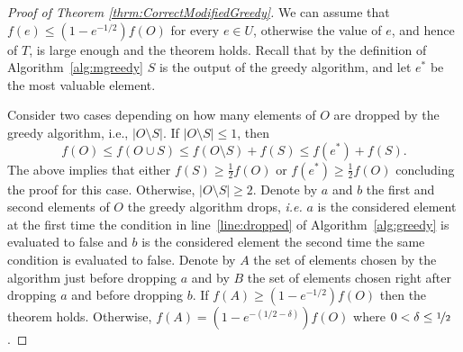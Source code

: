\documentclass[a4paper]{article}
\begin{document}

\begin{proof}[Proof of Theorem \ref{thrm:CorrectModifiedGreedy}]
	We can assume that $f(e) \leq (1 - e^{-1/2})f(O)$ for every $e \in U$, otherwise the value of $e$, and hence of $T$, is large enough and the theorem holds.
	Recall that by the definition of Algorithm~\ref{alg:mgreedy} $S$ is the output of the greedy algorithm, and let $e^*$ be the most valuable element.
	
	Consider two cases depending on how many elements of $O$ are dropped by the greedy algorithm, i.e., $|O \setminus S|$.
	If $|O \setminus S| \leq 1$, then
	$$
	f(O) \leq f(O \cup S) \leq f(O \setminus S) + f(S) \leq f(e^*) + f(S).
	$$
	The above implies that either $f(S) \geq \frac{1}{2}f(O)$ or $f(e^*) \geq \frac{1}{2}f(O)$ concluding the proof for this case.
	Otherwise, $|O \setminus S| \geq 2$.
	Denote by $a$ and $b$ the first and second elements of $O$ the greedy algorithm drops, {\em i.e.} $a$ is the considered element at the first time the condition in line~\ref{line:dropped} of Algorithm~\ref{alg:greedy} is evaluated to false and $b$ is the considered element the second time the same condition is evaluated to false.
	Denote by $A$ the set of elements chosen by the algorithm just before dropping $a$ and by
	$B$ the set of elements chosen right after dropping $a$ and before dropping $b$.
	If $f(A) \geq (1 - e^{-1/2})f(O)$ then the theorem holds.
	Otherwise, $f(A) = (1 - e^{-(1/2 - \delta)})f(O)$ where $0 < \delta \leq \nicefrac[]{1}{2}$.


\end{proof}
\end{document}
